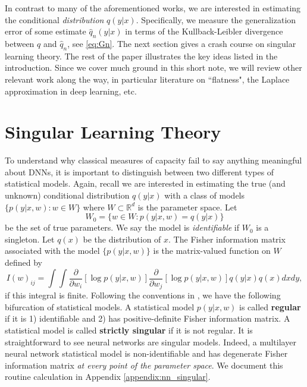 \documentclass{article} %
\begin{document}
In contrast to many of the aforementioned works, we are interested in estimating the conditional \textit{distribution} $q(y|x)$. Specifically, we measure the generalization error of some estimate $\hat q_n(y|x)$ in terms of the Kullback-Leibler divergence between $q$ and $\hat q_n$, see \eqref{eq:Gn}. The next section gives a crash course on singular learning theory. The rest of the paper illustrates the key ideas listed in the introduction. Since we cover much ground in this short note, we will review other relevant work along the way, in particular literature on ``flatness", the Laplace approximation in deep learning, etc. 

\section{Singular Learning Theory}
To understand why classical measures of capacity fail to say anything meaningful about DNNs, it is important to distinguish between two different types of statistical models. Again, recall we are interested in estimating the true (and unknown) conditional distribution $q(y|x)$ with a class of models $\{p(y|x,w): w \in W\}$ where $W \subset \mathbb R^d$ is the parameter space. Let 
$$
W_0 = \{w \in W: p(y|x,w)=q(y|x)\}
$$
 be the set of true parameters. We say the model is \textit{identifiable} if $W_0$ is a singleton. Let $q(x)$ be the distribution of $x$. The Fisher information matrix associated with the model $\{p(y|x,w)\}$ is the matrix-valued function on $W$ defined by
 \begin{equation*}
 I(w)_{ij} = \int\!\int \frac{\partial}{\partial w_i}[ \log p(y|x,w) ] \frac{\partial}{\partial w_j}[ \log p(y|x,w) ] q(y|x) q(x) dx dy,
 \label{eq:FIM}
 \end{equation*}
if this integral is finite. 
Following the conventions in \cite{watanabe_algebraic_2009}, we have the following bifurcation of statistical models.
A statistical model $p(y|x,w)$ is called \textbf{regular} if it is 1) identifiable and 2) has positive-definite Fisher information matrix. A statistical model is called \textbf{strictly singular} if it is not regular. 
It is straightforward to see neural networks are singular models. Indeed, a multilayer neural network statistical model is non-identifiable and has degenerate Fisher information matrix \emph{at every point of the parameter space}. We document this routine calculation in Appendix \ref{appendix:nn_singular}. 
\end{document}
